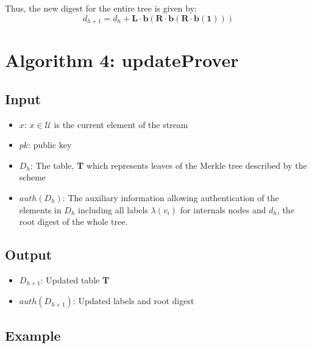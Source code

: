 \documentclass[11pt, letterpaper, oneside]{article}
\begin{document}
	Thus, the new digest for the entire tree is given by:
	\begin{equation}
	d_{h+1} = d_{h} + \textbf{L} \cdot \textbf{b} ( \textbf{R} \cdot \textbf{b} ( \textbf{R} \cdot \textbf{b} ( \textbf{1} ) )  )
	\end{equation}


\section{Algorithm 4: updateProver}
\subsection{Input}
	\begin{itemize}
	\item $x$: $x \in \mathcal{U}$ is the current element of the stream
	\item $pk$:  public key
	\item $D_{h}$: The table, \textbf{T} which represents leaves of the Merkle tree described by the scheme
	\item $auth(D_{h})$: The auxiliary information allowing authentication of the elements in $D_{h}$ including all labels $\lambda(v_{i})$ for internals nodes and $d_{h}$, the root digest of the whole tree.
	\end{itemize}
\subsection{Output}

	\begin{itemize}
	\item $D_{h + 1}$: Updated table \textbf{T}
	\item $auth(D_{h + 1})$: Updated labels and root digest
	\end{itemize}

\subsection{Example}
\end{document}
